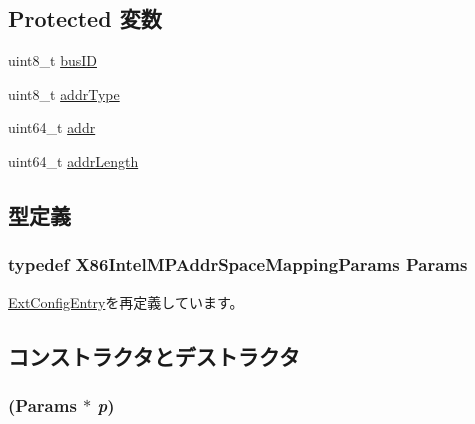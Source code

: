 \subsection*{Protected 変数}
\begin{DoxyCompactItemize}
\item 
uint8\_\-t \hyperlink{classX86ISA_1_1IntelMP_1_1AddrSpaceMapping_ac86b1934f811ad40b20b27d29c52a5d3}{busID}
\item 
uint8\_\-t \hyperlink{classX86ISA_1_1IntelMP_1_1AddrSpaceMapping_a9f34509b1c4a58ce6c6ab2f748cc4c36}{addrType}
\item 
uint64\_\-t \hyperlink{classX86ISA_1_1IntelMP_1_1AddrSpaceMapping_a0e89cf6b9f6cd3125470b1bed2b823df}{addr}
\item 
uint64\_\-t \hyperlink{classX86ISA_1_1IntelMP_1_1AddrSpaceMapping_a97f4838e0af1607eeaa66fbe722a9b5f}{addrLength}
\end{DoxyCompactItemize}


\subsection{型定義}
\hypertarget{classX86ISA_1_1IntelMP_1_1AddrSpaceMapping_a1ca24332f3ea92d341d5295799303c05}{
\subsubsection[{Params}]{\setlength{\rightskip}{0pt plus 5cm}typedef X86IntelMPAddrSpaceMappingParams {\bf Params}}}
\label{classX86ISA_1_1IntelMP_1_1AddrSpaceMapping_a1ca24332f3ea92d341d5295799303c05}


\hyperlink{classX86ISA_1_1IntelMP_1_1ExtConfigEntry_ac05617332b889b2a33387663c048f2a9}{ExtConfigEntry}を再定義しています。

\subsection{コンストラクタとデストラクタ}
\hypertarget{classX86ISA_1_1IntelMP_1_1AddrSpaceMapping_a95ce2e24ec2be9194be028de6be6da59}{
\subsubsection[{AddrSpaceMapping}]{ ({\bf Params} $\ast$ {\em p})}}
\label{classX86ISA_1_1IntelMP_1_1AddrSpaceMapping_a95ce2e24ec2be9194be028de6be6da59}



